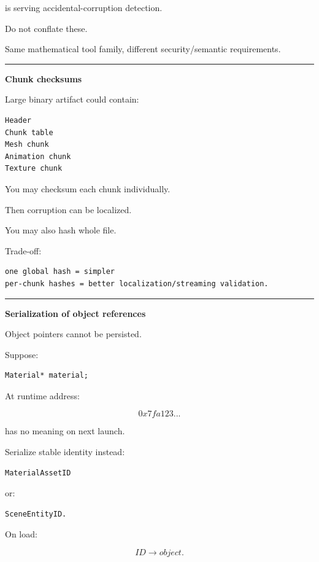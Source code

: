 is serving accidental-corruption detection.

Do not conflate these.

Same mathematical tool family, different security/semantic requirements.

\begin{center}\rule{0.5\linewidth}{0.5pt}\end{center}

\textbf{Chunk checksums}

Large binary artifact could contain:

\begin{verbatim}
Header
Chunk table
Mesh chunk
Animation chunk
Texture chunk
\end{verbatim}

You may checksum each chunk individually.

Then corruption can be localized.

You may also hash whole file.

Trade-off:

\begin{verbatim}
one global hash = simpler
per-chunk hashes = better localization/streaming validation.
\end{verbatim}

\begin{center}\rule{0.5\linewidth}{0.5pt}\end{center}

\textbf{Serialization of object references}

Object pointers cannot be persisted.

Suppose:

\begin{verbatim}
Material* material;
\end{verbatim}

At runtime address:

\[
0x7fa123...
\]

has no meaning on next launch.

Serialize stable identity instead:

\begin{verbatim}
MaterialAssetID
\end{verbatim}

or:

\begin{verbatim}
SceneEntityID.
\end{verbatim}

On load:

\[
ID\rightarrow object.
\]

